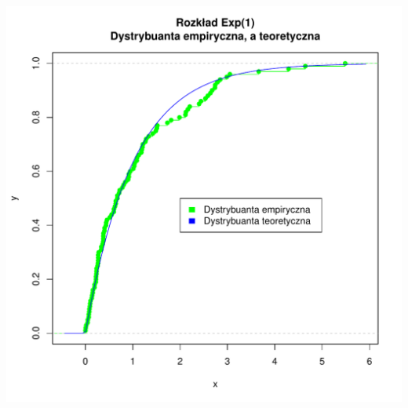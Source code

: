 \documentclass[12pt, a4paper]{article}\usepackage[]{graphicx}\usepackage[]{xcolor}
\makeatletter
\def\maxwidth{ %
  \ifdim\Gin@nat@width>\linewidth
    \linewidth
  \else
    \Gin@nat@width
  \fi
}
\newenvironment{knitrout}{}{} %
\makeatother
\begin{document}
\begin{knitrout}
{\centering \includegraphics[width=\maxwidth]{figure/unnamed-chunk-1-2} 

}


\end{knitrout}
\newpage
\end{document}
